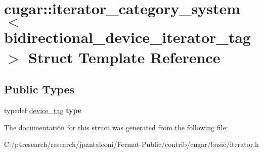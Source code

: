 \hypertarget{structcugar_1_1iterator__category__system_3_01bidirectional__device__iterator__tag_01_4}{}\section{cugar\+:\+:iterator\+\_\+category\+\_\+system$<$ bidirectional\+\_\+device\+\_\+iterator\+\_\+tag $>$ Struct Template Reference}
\label{structcugar_1_1iterator__category__system_3_01bidirectional__device__iterator__tag_01_4}
\subsection*{Public Types}
\begin{DoxyCompactItemize}
\item 
\mbox{\label{structcugar_1_1iterator__category__system_3_01bidirectional__device__iterator__tag_01_4_ac583e2610b615493c4259eb826df51bd}} 
typedef \hyperlink{structcugar_1_1device__tag}{device\+\_\+tag} {\bfseries type}
\end{DoxyCompactItemize}


The documentation for this struct was generated from the following file\+:\begin{DoxyCompactItemize}
\item 
C\+:/p4research/research/jpantaleoni/\+Fermat-\/\+Public/contrib/cugar/basic/iterator.\+h\end{DoxyCompactItemize}
